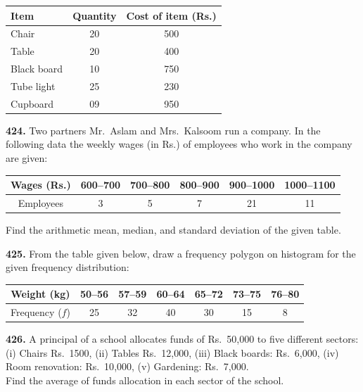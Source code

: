 \documentclass[11pt]{article}
\begin{document}
\begin{center}
\begin{tabular}{|l|c|c|}
\hline
Item & Quantity & Cost of item (Rs.) \\
\hline
Chair & 20 & 500 \\
Table & 20 & 400 \\
Black board & 10 & 750 \\
Tube light & 25 & 230 \\
Cupboard & 09 & 950 \\
\hline
\end{tabular}
\end{center}

\bigskip
\noindent\textbf{424.} Two partners Mr.\ Aslam and Mrs.\ Kalsoom run a company. In the following data the weekly wages (in Rs.) of employees who work in the company are given:

\begin{center}
\begin{tabular}{|c|c|c|c|c|c|}
\hline
Wages (Rs.) & 600--700 & 700--800 & 800--900 & 900--1000 & 1000--1100 \\
\hline
Employees & 3 & 5 & 7 & 21 & 11 \\
\hline
\end{tabular}
\end{center}

Find the arithmetic mean, median, and standard deviation of the given table.

\bigskip
\noindent\textbf{425.} From the table given below, draw a frequency polygon on histogram for the given frequency distribution:

\begin{center}
\begin{tabular}{|c|c|c|c|c|c|c|}
\hline
Weight (kg) & 50--56 & 57--59 & 60--64 & 65--72 & 73--75 & 76--80 \\
\hline
Frequency ($f$) & 25 & 32 & 40 & 30 & 15 & 8 \\
\hline
\end{tabular}
\end{center}

\bigskip
\noindent\textbf{426.} A principal of a school allocates funds of Rs.~50{,}000 to five different sectors:
(i) Chairs Rs.~1500, \quad (ii) Tables Rs.~12{,}000, \quad (iii) Black boards: Rs.~6{,}000, \quad (iv) Room renovation: Rs.~10{,}000, \quad (v) Gardening: Rs.~7{,}000. \\
Find the average of funds allocation in each sector of the school.
\end{document}
